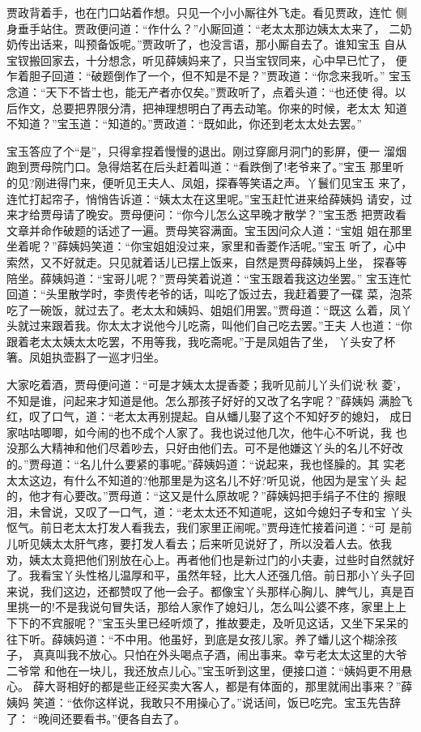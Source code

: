 贾政背着手，也在门口站着作想。只见一个小小厮往外飞走。看见贾政，连忙
侧身垂手站住。贾政便问道：“作什么？”小厮回道：“老太太那边姨太太来了，
二奶奶传出话来，叫预备饭呢。”贾政听了，也没言语，那小厮自去了。谁知宝玉
自从宝钗搬回家去，十分想念，听见薛姨妈来了，只当宝钗同来，心中早已忙了，
便乍着胆子回道：“破题倒作了一个，但不知是不是？”贾政道：“你念来我听。”
宝玉念道：“天下不皆士也，能无产者亦仅矣。”贾政听了，点着头道：“也还使
得。以后作文，总要把界限分清，把神理想明白了再去动笔。你来的时候，老太太
知道不知道？”宝玉道：“知道的。”贾政道：“既如此，你还到老太太处去罢。”

宝玉答应了个“是”，只得拿捏着慢慢的退出。刚过穿廊月洞门的影屏，便一
溜烟跑到贾母院门口。急得焙茗在后头赶着叫道：“看跌倒了!老爷来了。”宝玉
那里听的见?刚进得门来，便听见王夫人、凤姐，探春等笑语之声。丫鬟们见宝玉
来了，连忙打起帘子，悄悄告诉道：“姨太太在这里呢。”宝玉赶忙进来给薛姨妈
请安，过来才给贾母请了晚安。贾母便问：“你今儿怎么这早晚才散学？”宝玉悉
把贾政看文章并命作破题的话述了一遍。贾母笑容满面。宝玉因问众人道：“宝姐
姐在那里坐着呢？”薛姨妈笑道：“你宝姐姐没过来，家里和香菱作活呢。”宝玉
听了，心中索然，又不好就走。只见就着话儿已摆上饭来，自然是贾母薛姨妈上坐，
探春等陪坐。薛姨妈道：“宝哥儿呢？”贾母笑着说道：“宝玉跟着我这边坐罢。”
宝玉连忙回道：“头里散学时，李贵传老爷的话，叫吃了饭过去，我赶着要了一碟
菜，泡茶吃了一碗饭，就过去了。老太太和姨妈、姐姐们用罢。”贾母道：“既这
么着，凤丫头就过来跟着我。你太太才说他今儿吃斋，叫他们自己吃去罢。”王夫
人也道：“你跟着老太太姨太太吃罢，不用等我，我吃斋呢。”于是凤姐告了坐，
丫头安了杯箸。凤姐执壶斟了一巡才归坐。

大家吃着酒，贾母便问道：“可是才姨太太提香菱；我听见前儿丫头们说‘秋
菱’，不知是谁，问起来才知道是他。怎么那孩子好好的又改了名字呢？”薛姨妈
满脸飞红，叹了口气，道：“老太太再别提起。自从蟠儿娶了这个不知好歹的媳妇，
成日家咕咕唧唧，如今闹的也不成个人家了。我也说过他几次，他牛心不听说，我
也没那么大精神和他们尽着吵去，只好由他们去。可不是他嫌这丫头的名儿不好改
的。”贾母道：“名儿什么要紧的事呢。”薛姨妈道：“说起来，我也怪臊的。其
实老太太这边，有什么不知道的?他那里是为这名儿不好?听见说，他因为是宝丫头
起的，他才有心要改。”贾母道：“这又是什么原故呢？”薛姨妈把手绢子不住的
擦眼泪，未曾说，又叹了一口气，道：“老太太还不知道呢，这如今媳妇子专和宝
丫头怄气。前日老太太打发人看我去，我们家里正闹呢。”贾母连忙接着问道：“可
是前儿听见姨太太肝气疼，要打发人看去；后来听见说好了，所以没着人去。依我
劝，姨太太竟把他们别放在心上。再者他们也是新过门的小夫妻，过些时自然就好
了。我看宝丫头性格儿温厚和平，虽然年轻，比大人还强几倍。前日那小丫头子回
来说，我们这边，还都赞叹了他一会子。都像宝丫头那样心胸儿、脾气儿，真是百
里挑一的!不是我说句冒失话，那给人家作了媳妇儿，怎么叫公婆不疼，家里上上
下下的不宾服呢？”宝玉头里已经听烦了，推故要走，及听见这话，又坐下呆呆的
往下听。薛姨妈道：“不中用。他虽好，到底是女孩儿家。养了蟠儿这个糊涂孩子，
真真叫我不放心。只怕在外头喝点子酒，闹出事来。幸亏老太太这里的大爷二爷常
和他在一块儿，我还放点儿心。”宝玉听到这里，便接口道：“姨妈更不用悬心。
薛大哥相好的都是些正经买卖大客人，都是有体面的，那里就闹出事来？”薛姨妈
笑道：“依你这样说，我敢只不用操心了。”说话间，饭已吃完。宝玉先告辞了：
“晚间还要看书。”便各自去了。

